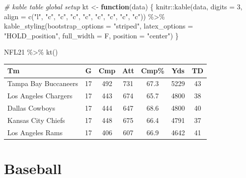 \documentclass[
  11pt,
]{book}
\newenvironment{Shaded}{\begin{snugshade}}{\end{snugshade}}
\newcommand{\AttributeTok}[1]{\textcolor[rgb]{0.77,0.63,0.00}{#1}}
\newcommand{\CommentTok}[1]{\textcolor[rgb]{0.56,0.35,0.01}{\textit{#1}}}
\newcommand{\ControlFlowTok}[1]{\textcolor[rgb]{0.13,0.29,0.53}{\textbf{#1}}}
\newcommand{\DecValTok}[1]{\textcolor[rgb]{0.00,0.00,0.81}{#1}}
\newcommand{\FunctionTok}[1]{\textcolor[rgb]{0.00,0.00,0.00}{#1}}
\newcommand{\NormalTok}[1]{#1}
\newcommand{\OtherTok}[1]{\textcolor[rgb]{0.56,0.35,0.01}{#1}}
\newcommand{\SpecialCharTok}[1]{\textcolor[rgb]{0.00,0.00,0.00}{#1}}
\newcommand{\StringTok}[1]{\textcolor[rgb]{0.31,0.60,0.02}{#1}}
\theoremstyle{definition}
\theoremstyle{definition}
\theoremstyle{definition}
\theoremstyle{definition}
\theoremstyle{remark}
\begin{document}
\begin{Shaded}
\begin{Highlighting}[]
\CommentTok{\# kable table global setup}
\NormalTok{kt }\OtherTok{\textless{}{-}} \ControlFlowTok{function}\NormalTok{(data) \{}
\NormalTok{    knitr}\SpecialCharTok{::}\FunctionTok{kable}\NormalTok{(data, }\AttributeTok{digits =} \DecValTok{3}\NormalTok{, }\AttributeTok{align =} \FunctionTok{c}\NormalTok{(}\StringTok{"l"}\NormalTok{, }\StringTok{"c"}\NormalTok{, }\StringTok{"c"}\NormalTok{, }\StringTok{"c"}\NormalTok{, }\StringTok{"c"}\NormalTok{, }\StringTok{"c"}\NormalTok{, }\StringTok{"c"}\NormalTok{, }\StringTok{"c"}\NormalTok{,}
        \StringTok{"c"}\NormalTok{)) }\SpecialCharTok{\%\textgreater{}\%}
        \FunctionTok{kable\_styling}\NormalTok{(}\AttributeTok{bootstrap\_options =} \StringTok{"striped"}\NormalTok{, }\AttributeTok{latex\_options =} \StringTok{"HOLD\_position"}\NormalTok{,}
            \AttributeTok{full\_width =}\NormalTok{ F, }\AttributeTok{position =} \StringTok{"center"}\NormalTok{)}
\NormalTok{\}}
\end{Highlighting}
\end{Shaded}

\begin{Shaded}
\begin{Highlighting}[]
\NormalTok{NFL21 }\SpecialCharTok{\%\textgreater{}\%}
    \FunctionTok{kt}\NormalTok{()}
\end{Highlighting}
\end{Shaded}

\begin{table}[H]
\centering
\begin{tabular}{l|c|c|c|c|c|c}
\hline
Tm & G & Cmp & Att & Cmp\% & Yds & TD\\
\hline
Tampa Bay Buccaneers & 17 & 492 & 731 & 67.3 & 5229 & 43\\
\hline
Los Angeles Chargers & 17 & 443 & 674 & 65.7 & 4800 & 38\\
\hline
Dallas Cowboys & 17 & 444 & 647 & 68.6 & 4800 & 40\\
\hline
Kansas City Chiefs & 17 & 448 & 675 & 66.4 & 4791 & 37\\
\hline
Los Angeles Rams & 17 & 406 & 607 & 66.9 & 4642 & 41\\
\hline
\end{tabular}
\end{table}

\newpage

\hypertarget{baseball}{%
\section{Baseball}\label{baseball}}
\end{document}

